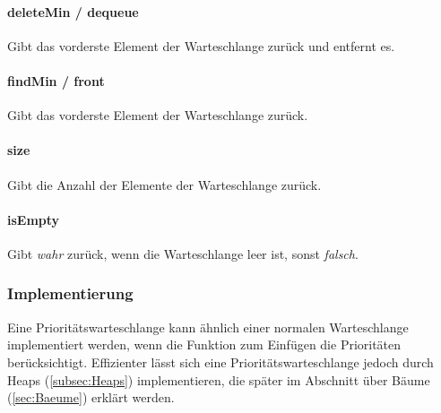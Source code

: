 \paragraph{deleteMin / dequeue} Gibt das vorderste Element der Warteschlange zurück und entfernt es.
\paragraph{findMin / front} Gibt das vorderste Element der Warteschlange zurück.
\paragraph{size} Gibt die Anzahl der Elemente der Warteschlange zurück.
\paragraph{isEmpty} Gibt \textit{wahr} zurück, wenn die Warteschlange leer ist, sonst \textit{falsch}.

\subsubsection{Implementierung}
Eine Prioritätswarteschlange kann ähnlich einer normalen Warteschlange implementiert werden, wenn die Funktion zum Einfügen die Prioritäten berücksichtigt.
Effizienter lässt sich eine Prioritätswarteschlange jedoch durch Heaps (\ref{subsec:Heaps}) implementieren, die später im Abschnitt über Bäume (\ref{sec:Baeume}) erklärt werden.
